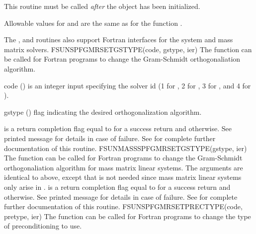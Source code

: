 {
  This routine must be called \emph{after} the {\nvector} object has
  been initialized.

  Allowable values for  and  are the same as for
  the {\CC} function \newline {}. 
}
%
The , 
and \newline {} routines also
support Fortran interfaces for the system and mass matrix solvers.
%
%
{
  FSUNSPFGMRSETGSTYPE(code, gstype, ier)
}
{
  The function  can be called for Fortran
  programs to change the Gram-Schmidt orthogonaliation algorithm.
}
{
  \begin{args}[gstype]
  \item[code] ()
    is an integer input specifying the solver id (1 for {\cvode}, 2
    for {\ida}, 3 for {\kinsol}, and 4 for {\arkode}).
  \item[gstype] ()
    flag indicating the desired orthogonalization algorithm.
  \end{args}
}
{
   is a  return completion flag equal to  for a success
  return and  otherwise. See printed message for details in case
  of failure.
}
{
  See  for complete further documentation of
  this routine.
}
%
%
{
  FSUNMASSSPFGMRSETGSTYPE(gstype, ier)
}
{
  The function  can be called for Fortran
  programs to change the Gram-Schmidt orthogonaliation algorithm for
  mass matrix linear systems.
}
{
  The arguments are identical to  above, except that
   is not needed since mass matrix linear systems only arise
  in {\arkode}.
}
{
   is a  return completion flag equal to  for a success
  return and  otherwise. See printed message for details in case
  of failure.
}
{
  See  for complete further documentation of
  this routine.
}
%
%
{
  FSUNSPFGMRSETPRECTYPE(code, pretype, ier)
}
{
  The function  can be called for Fortran
  programs to change the type of preconditioning to use.
}
